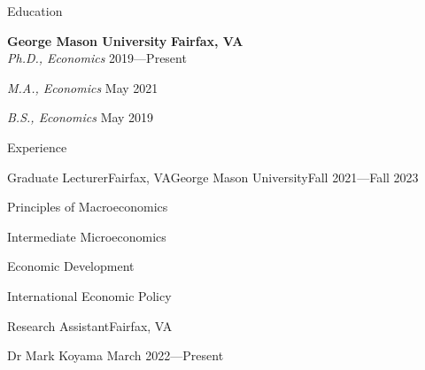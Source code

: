 \documentclass{resume} %
\begin{document}

\begin{rSection}{Education}

    \textbf{George Mason University} \hfill \textbf{Fairfax, VA} \\ 
    \textit{Ph.D., Economics} \hfill {2019---Present}

    \textit{M.A., Economics} \hfill {May 2021}

    \textit{B.S., Economics} \hfill {May 2019}

\end{rSection}


\begin{rSection}{Experience}

    \begin{rSubsection}{Graduate Lecturer}{Fairfax, VA}{George Mason University}{\textup{Fall 2021---Fall 2023}}
        \item Principles of Macroeconomics
        \item Intermediate Microeconomics
        \item Economic Development
        \item International Economic Policy
    \end{rSubsection}
    \vspace{-1mm} %
    \begin{rSubsection}{Research Assistant}{Fairfax, VA}{}{}
        \item[] \hspace{-5mm} Dr Mark Koyama \hfill{March 2022---Present}
    \end{rSubsection}

\end{rSection}

\end{document}
